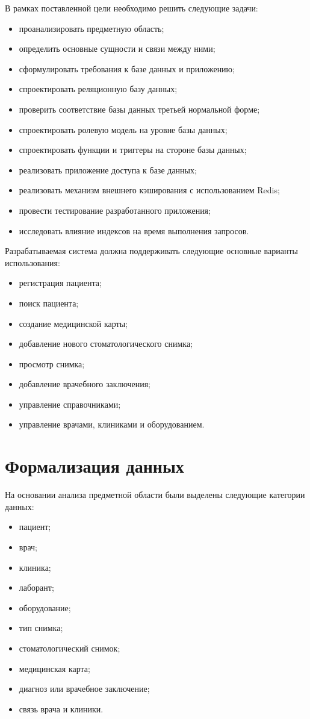 В рамках поставленной цели необходимо решить следующие задачи:
\begin{itemize}
	\item проанализировать предметную область;
	\item определить основные сущности и связи между ними;
	\item сформулировать требования к базе данных и приложению;
	\item спроектировать реляционную базу данных;
	\item проверить соответствие базы данных третьей нормальной форме;
	\item спроектировать ролевую модель на уровне базы данных;
	\item спроектировать функции и триггеры на стороне базы данных;
	\item реализовать приложение доступа к базе данных;
	\item реализовать механизм внешнего кэширования с использованием Redis;
	\item провести тестирование разработанного приложения;
	\item исследовать влияние индексов на время выполнения запросов.
\end{itemize}

Разрабатываемая система должна поддерживать следующие основные варианты использования:
\begin{itemize}
	\item регистрация пациента;
	\item поиск пациента;
	\item создание медицинской карты;
	\item добавление нового стоматологического снимка;
	\item просмотр снимка;
	\item добавление врачебного заключения;
	\item управление справочниками;
	\item управление врачами, клиниками и оборудованием.
\end{itemize}

\section{Формализация данных}

На основании анализа предметной области были выделены следующие категории данных:
\begin{itemize}
	\item пациент;
	\item врач;
	\item клиника;
	\item лаборант;
	\item оборудование;
	\item тип снимка;
	\item стоматологический снимок;
	\item медицинская карта;
	\item диагноз или врачебное заключение;
	\item связь врача и клиники.
\end{itemize}

